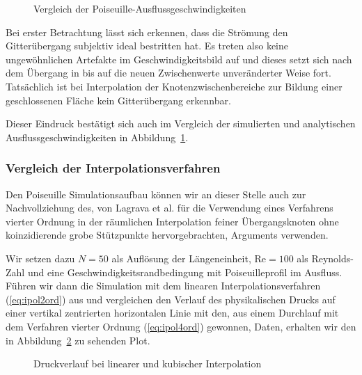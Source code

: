 \begin{figure}[h]
\begin{adjustbox}{center}

\end{adjustbox}
\caption{Vergleich der Poiseuille-Ausflussgeschwindigkeiten}
\label{fig:PoiseuilleOutflowProfile}
\end{figure}

Bei erster Betrachtung lässt sich erkennen, dass die Strömung den Gitterübergang subjektiv ideal bestritten hat. Es treten also keine ungewöhnlichen Artefakte im Geschwindigkeitsbild auf und dieses setzt sich nach dem Übergang in bis auf die neuen Zwischenwerte unveränderter Weise fort. Tatsächlich ist bei Interpolation der Knotenzwischenbereiche zur Bildung einer geschlossenen Fläche kein Gitterübergang erkennbar.

Dieser Eindruck bestätigt sich auch im Vergleich der simulierten und analytischen Ausflussgeschwindigkeiten in Abbildung~\ref{fig:PoiseuilleOutflowProfile}.

\newpage
\subsubsection{Vergleich der Interpolationsverfahren}

Den Poiseuille Simulationsaufbau können wir an dieser Stelle auch zur Nachvollziehung des, von Lagrava et al. für die Verwendung eines Verfahrens vierter Ordnung in der räumlichen Interpolation feiner Übergangsknoten ohne koinzidierende grobe Stützpunkte hervorgebrachten, Arguments verwenden.

Wir setzen dazu \(N=50\) als Auflösung der Längeneinheit, \(\text{Re}=100\) als Reynolds-Zahl und eine Geschwindigkeitsrandbedingung mit Poiseuilleprofil im Ausfluss. Führen wir dann die Simulation mit dem linearen Interpolationsverfahren (\ref{eq:ipol2ord}) aus und vergleichen den Verlauf des physikalischen Drucks auf einer vertikal zentrierten horizontalen Linie mit den, aus einem Durchlauf mit dem Verfahren vierter Ordnung (\ref{eq:ipol4ord}) gewonnen, Daten, erhalten wir den in Abbildung~\ref{fig:PoiseuilleMassloss} zu sehenden Plot.

\begin{figure}[h]
\begin{adjustbox}{center}

\end{adjustbox}
\caption{Druckverlauf bei linearer und kubischer Interpolation \cite[vgl.~Abb.~11]{lagrava12}}
\label{fig:PoiseuilleMassloss}
\end{figure}


